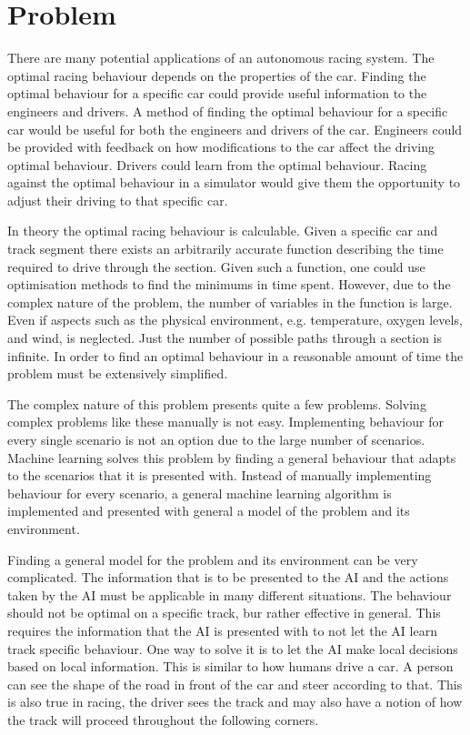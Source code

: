 \section{Problem}
There are many potential applications of an autonomous racing system. The optimal racing behaviour depends on the properties of the car. Finding the optimal behaviour for a specific car could provide useful information to the engineers and drivers. A method of finding the optimal behaviour for a specific car would be useful for both the engineers and drivers of the car. Engineers could be provided with feedback on how modifications to the car affect the driving optimal behaviour. Drivers could learn from the optimal behaviour. Racing against the optimal behaviour in a simulator would give them the opportunity to adjust their driving to that specific car.

In theory the optimal racing behaviour is calculable. Given a specific car and track segment there exists an arbitrarily accurate function describing the time required to drive through the section. Given such a function, one could use optimisation methods to find the minimums in time spent. However, due to the complex nature of the problem, the number of variables in the function is large. Even if aspects such as the physical environment, e.g. temperature, oxygen levels, and wind, is neglected. Just the number of possible paths through a section is infinite. In order to find an optimal behaviour in a reasonable amount of time the problem must be extensively simplified.

The complex nature of this problem presents quite a few problems. Solving complex problems like these manually is not easy. Implementing behaviour for every single scenario is not an option due to the large number of scenarios. Machine learning solves this problem by finding a general behaviour that adapts to the scenarios that it is presented with. Instead of manually implementing behaviour for every scenario, a general machine learning algorithm is implemented and presented with general a model of the problem and its environment.

Finding a general model for the problem and its environment can be very complicated. The information that is to be presented to the AI and the actions taken by the AI must be applicable in many different situations. The behaviour should not be optimal on a specific track, bur rather effective in general. This requires the information that the AI is presented with to not let the AI learn track specific behaviour. One way to solve it is to let the AI make local decisions based on local information. This is similar to how humans drive a car. A person can see the shape of the road in front of the car and steer according to that. This is also true in racing, the driver sees the track and may also have a notion of how the track will proceed throughout the following corners.

